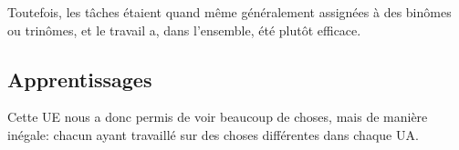 Toutefois, les tâches étaient quand même généralement assignées à des binômes
ou trinômes, et le travail a, dans l'ensemble, été plutôt efficace.

\subsection{Apprentissages}
Cette UE nous a donc permis de voir beaucoup de choses, mais de manière
inégale: chacun ayant travaillé sur des choses différentes dans chaque UA.

